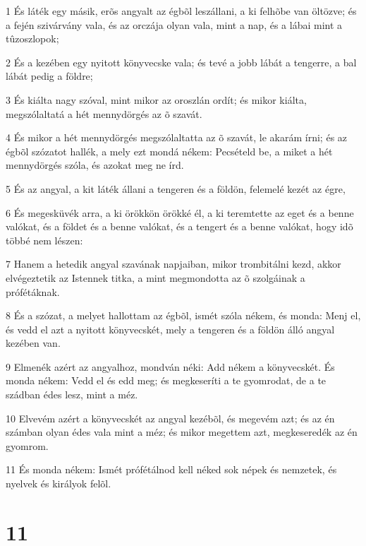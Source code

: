 \par 1 És láték egy másik, erõs angyalt az égbõl leszállani, a ki felhõbe van öltözve; és a fején szivárvány vala, és az orczája olyan vala, mint a nap, és a lábai mint a tûzoszlopok;
\par 2 És a kezében egy nyitott könyvecske vala; és tevé a jobb lábát a tengerre, a bal lábát pedig a földre;
\par 3 És kiálta nagy szóval, mint mikor az oroszlán ordít; és mikor kiálta, megszólaltatá a hét mennydörgés az õ szavát.
\par 4 És mikor a hét mennydörgés megszólaltatta az õ szavát, le akarám írni; és az égbõl szózatot hallék, a mely ezt mondá nékem: Pecsételd be, a miket a hét mennydörgés szóla, és azokat meg ne írd.
\par 5 És az angyal, a kit láték állani a tengeren és a földön, felemelé kezét az égre,
\par 6 És megesküvék arra, a ki örökkön örökké él, a ki teremtette az eget és a benne valókat, és a földet és a benne valókat, és a tengert és a benne valókat, hogy idõ többé nem lészen:
\par 7 Hanem a hetedik angyal szavának napjaiban, mikor trombitálni kezd, akkor elvégeztetik az Istennek titka, a mint megmondotta az õ szolgáinak a prófétáknak.
\par 8 És a szózat, a melyet hallottam az égbõl, ismét szóla nékem, és monda: Menj el, és vedd el azt a nyitott könyvecskét, mely a tengeren és a földön álló angyal kezében van.
\par 9 Elmenék azért az angyalhoz, mondván néki: Add nékem a könyvecskét. És monda nékem: Vedd el és edd meg; és megkeseríti a te gyomrodat, de a te szádban édes lesz, mint a méz.
\par 10 Elvevém azért a könyvecskét az angyal kezébõl, és megevém azt; és az én számban olyan édes vala mint a méz; és mikor megettem azt, megkeseredék az én gyomrom.
\par 11 És monda nékem: Ismét prófétálnod kell néked sok népek és nemzetek, és nyelvek és királyok felõl.

\chapter{11}

